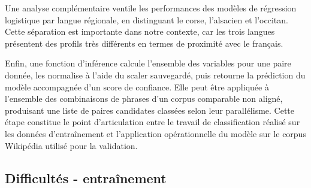 Une analyse complémentaire ventile les performances des modèles de régression logistique par langue régionale, en distinguant
le corse, l'alsacien et l'occitan. Cette séparation est importante dans notre contexte, car les trois
langues présentent des profils très différents en termes de proximité avec le français.

Enfin, une fonction d'inférence calcule l'ensemble des variables pour une paire donnée, les normalise à l'aide du scaler
sauvegardé, puis retourne la prédiction du modèle accompagnée d'un score de confiance. Elle peut être
appliquée à l'ensemble des combinaisons de phrases d'un corpus comparable non aligné, produisant une
liste de paires candidates classées selon leur parallélisme. Cette étape constitue le point
d'articulation entre le travail de classification réalisé sur les données d'entraînement
et l'application opérationnelle du modèle sur le corpus Wikipédia utilisé pour la validation.

\subsection{Difficultés - entraînement}

